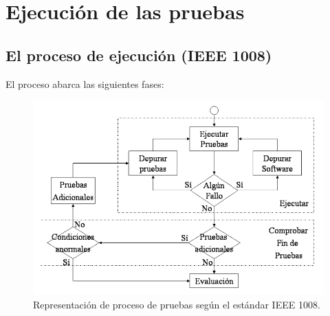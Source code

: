 \section{Ejecución de las pruebas}

\subsection{El proceso de ejecución (IEEE 1008)}

El proceso abarca las siguientes fases:

\begin{figure}[H]
    \centering
    \includegraphics[width=0.75\linewidth]{Resources/Tema6/IEEE_1008.png}
    \caption{Representación de proceso de pruebas según el estándar IEEE 1008.}
\end{figure}

